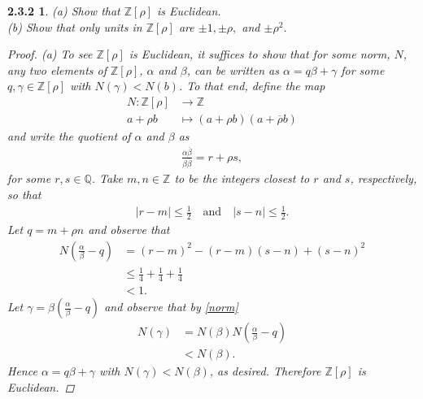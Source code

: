 \documentclass[10pt]{amsart}
\begin{document}
\newtheorem*{3}{2.3.2}
\begin{3}
  (a) Show that \(\mathbb{Z}[\rho]\) is Euclidean.\\
  (b) Show that only units in \(\mathbb{Z}[\rho]\) are \(\pm 1, \pm \rho,\) and \(\pm \rho^2\).
  \begin{proof}
    (a) To see \(\mathbb{Z}[\rho]\) is Euclidean, it suffices to show that for some norm, \(N\), any two elements of \(\mathbb{Z}[\rho]\), \(\alpha\) and \(\beta\), can be written as \(\alpha = q\beta + \gamma\) for some \(q,\gamma \in \mathbb{Z}[\rho]\) with \(N(\gamma) < N(b)\).
  To that end, define the map
  \begin{align*}
      N: \mathbb{Z}[\rho] & \longrightarrow \mathbb{Z}\\ 
      a + \rho b & \longmapsto (a + \rho b)(a + \overline{\rho}b)
    \end{align*}
    and write the quotient of \(\alpha\) and \(\beta\) as
    \begin{align*}
      \frac{\alpha\overline{\beta}}{\beta\overline{\beta}} = r + {\rho}s,
    \end{align*}
    for some \(r,s \in \mathbb{Q}\).
    Take \(m,n \in \mathbb{Z}\) to be the integers closest to \(r\) and \(s\), respectively, so that
    \begin{align*}
      |r - m| \leq \frac{1}{2} \quad \text{and} \quad  |s - n| \leq \frac{1}{2}.
    \end{align*}
    Let \(q = m + {\rho}n\) and observe that
    \begin{equation}
      \label{norm}
      \begin{split}
        N(\frac{\alpha}{\beta} - q) &= (r - m)^2 - (r-m)(s-n) + (s-n)^2\\
        & \leq \frac{1}{4} + \frac{1}{4} + \frac{1}{4}\\
        & < 1.
      \end{split}
    \end{equation}
    Let \(\gamma = {\beta}(\frac{\alpha}{\beta} - q)\) and observe that by \eqref{norm}
    \begin{equation*}
      \begin{split}
        N(\gamma) &= N(\beta)N(\frac{\alpha}{\beta} - q)\\
        &< N(\beta).
      \end{split}
    \end{equation*}
    Hence \(\alpha = q\beta + \gamma\) with \(N(\gamma) < N(\beta)\), as desired.
    Therefore \(\mathbb{Z}[\rho]\) is Euclidean.


\end{proof}
\end{3}
\end{document}
